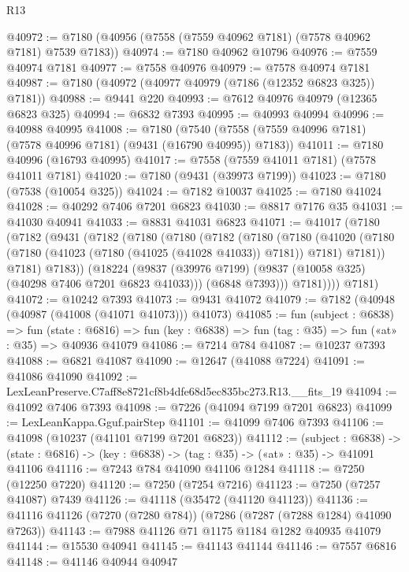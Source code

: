 \begin{lexlean}{R13}
\begin{coremodule}
@40972 := @7180 (@40956 (@7558 (@7559 @40962 @7181) (@7578 @40962 @7181) @7539 @7183))
@40974 := @7180 @40962 @10796
@40976 := @7559 @40974 @7181
@40977 := @7558 @40976
@40979 := @7578 @40974 @7181
@40987 := @7180 (@40972 (@40977 @40979 (@7186 (@12352 @6823 @325)) @7181))
@40988 := @9441 @220
@40993 := @7612 @40976 @40979 (@12365 @6823 @325)
@40994 := @6832 @7393
@40995 := @40993 @40994
@40996 := @40988 @40995
@41008 := @7180
    (@7540 (@7558 (@7559 @40996 @7181) (@7578 @40996 @7181) (@9431 (@16790 @40995)) @7183))
@41011 := @7180 @40996 (@16793 @40995)
@41017 := @7558 (@7559 @41011 @7181) (@7578 @41011 @7181)
@41020 := @7180 (@9431 (@39973 @7199))
@41023 := @7180 (@7538 (@10054 @325))
@41024 := @7182 @10037
@41025 := @7180 @41024
@41028 := @40292 @7406 @7201 @6823
@41030 := @8817 @7176 @35
@41031 := @41030 @40941
@41033 := @8831 @41031 @6823
@41071 := @41017
    (@7180
      (@7182
        (@9431
          (@7182
            (@7180
              (@7180
                (@7182
                  (@7180
                    (@7180
                      (@41020
                        (@7180 (@7180 (@41023 (@7180 (@41025 (@41028 @41033)) @7181)) @7181) @7181))
                      @7181)
                    @7183))
                (@18224
                  (@9837 (@39976 @7199) (@9837 (@10058 @325) (@40298 @7406 @7201 @6823 @41033)))
                  (@6848 @7393)))
              @7181))))
      @7181)
@41072 := @10242 @7393
@41073 := @9431 @41072
@41079 := @7182 (@40948 (@40987 (@41008 (@41071 @41073))) @41073)
@41085 := fun (subject : @6838) =>
  fun (state : @6816) => fun (key : @6838) => fun (tag : @35) => fun («at» : @35) => @40936 @41079
@41086 := @7214 @784
@41087 := @10237 @7393
@41088 := @6821 @41087
@41090 := @12647 (@41088 @7224)
@41091 := @41086 @41090
@41092 := LexLeanPreserve.C7aff8e8721cf8b4dfe68d5ec835bc273.R13.__fits_19
@41094 := @41092 @7406 @7393
@41098 := @7226 (@41094 @7199 @7201 @6823)
@41099 := LexLeanKappa.Gguf.pairStep
@41101 := @41099 @7406 @7393
@41106 := @41098 (@10237 (@41101 @7199 @7201 @6823))
@41112 := (subject : @6838) ->
  (state : @6816) -> (key : @6838) -> (tag : @35) -> («at» : @35) -> @41091 @41106
@41116 := @7243 @784 @41090 @41106 @1284
@41118 := @7250 (@12250 @7220)
@41120 := @7250 (@7254 @7216)
@41123 := @7250 (@7257 @41087) @7439
@41126 := @41118 (@35472 (@41120 @41123))
@41136 := @41116 @41126 (@7270 (@7280 @784)) (@7286 (@7287 (@7288 @1284) @41090 @7263))
@41143 := @7988 @41126 @71 @1175 @1184 @1282 @40935 @41079
@41144 := @15530 @40941
@41145 := @41143 @41144
@41146 := @7557 @6816
@41148 := @41146 @40944 @40947

\end{coremodule}
\end{lexlean}
